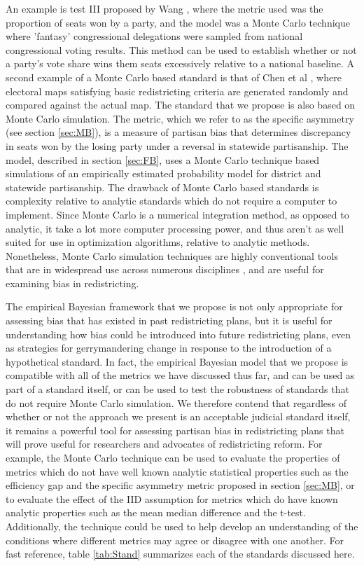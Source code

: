 \documentclass[preprint,12pt]{article}
\begin{document}
An example is test III proposed by Wang \cite{Wang__,Wang_2016_10.1089/elj.2016.0387}, where the metric used was the proportion of seats won by a party, and the model was a Monte Carlo technique where 'fantasy' congressional delegations were sampled from national congressional voting results.
This method can be used to establish whether or not a party's vote share wins them seats excessively relative to a national baseline.
A second example of a Monte Carlo based standard is that of Chen et al \cite{Chen_2015_10.1089/elj.2015.0317,Chen_2016_10.1016/j.electstud.2016.06.014}, where electoral maps satisfying basic redistricting criteria are generated randomly and compared against the actual map.
The standard that we propose is also based on Monte Carlo simulation.
The metric, which we refer to as the specific asymmetry (see section \ref{sec:MB}), is a measure of partisan bias that determines discrepancy in seats won by the losing party under a reversal in statewide partisanship.  
The model, described in section \ref{sec:FB}, uses a Monte Carlo technique based simulations of an empirically estimated probability model for district and statewide partisanship.
The drawback of Monte Carlo based standards is complexity relative to analytic standards which do not require a computer to implement.
Since Monte Carlo is a numerical integration method, as opposed to analytic, it take a lot more computer processing power, and thus aren't as well suited for use in optimization algorithms, relative to analytic methods.
Nonetheless, Monte Carlo simulation techniques are highly conventional tools that are in widespread use across numerous disciplines \cite{Kroese_2014_10.1002/wics.1314}, and are useful for examining bias in redistricting.

The empirical Bayesian framework that we propose is not only appropriate for assessing bias that has existed in past redistricting plans, but it is useful for understanding how bias could be introduced into future redistricting plans, even as strategies for gerrymandering change in response to the introduction of a hypothetical standard.
In fact, the empirical Bayesian model that we propose is compatible with all of the metrics we have discussed thus far, and can be used as part of a standard itself, or can be used to test the robustness of standards that do not require Monte Carlo simulation. 
We therefore contend that regardless of whether or not the approach we present is an acceptable judicial standard itself, it remains a powerful tool for assessing partisan bias in redistricting plans that will prove useful for researchers and advocates of redistricting reform.
For example, the Monte Carlo technique can be used to evaluate the properties of metrics which do not have well known analytic statistical properties such as the efficiency gap and the specific asymmetry metric proposed in section \ref{sec:MB}, or to evaluate the effect of the IID assumption for metrics which do have known analytic properties such as the mean median difference and the t-test.
Additionally, the technique could be used to help develop an understanding of the conditions where different metrics may agree or disagree with one another.
For fast reference, table \ref{tab:Stand} summarizes each of the standards discussed here. 
\end{document}
